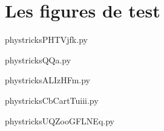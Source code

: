 \section{Les figures de test}



    \newcommand{\CaptionFigPHTVjfk}{This is a default caption, automatically generated; do not change.}
    \begin{center}
        
    \end{center}
    phystricksPHTVjfk.py

    

    \clearpage
    


    \newcommand{\CaptionFigQQa}{This is a default caption, automatically generated; do not change.}
    \begin{center}
        
    \end{center}
    phystricksQQa.py

    

    \clearpage
    


    \newcommand{\CaptionFigALIzHFm}{This is a default caption, automatically generated; do not change.}
    \begin{center}
        
    \end{center}
    phystricksALIzHFm.py

    

    \clearpage
    


    \newcommand{\CaptionFigCbCartTuiii}{This is a default caption, automatically generated; do not change.}
    \begin{center}
        
    \end{center}
    phystricksCbCartTuiii.py

    

    \clearpage
    


    \newcommand{\CaptionFigUQZooGFLNEq}{This is a default caption, automatically generated; do not change.}
    \begin{center}
        
    \end{center}
    phystricksUQZooGFLNEq.py

